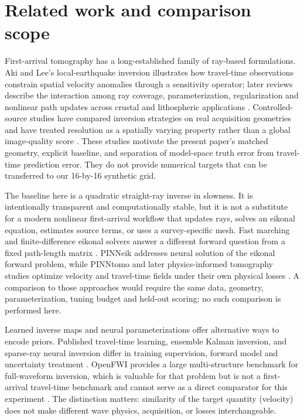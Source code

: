 \documentclass[11pt]{article}
\begin{document}
\section{Related work and comparison scope}\label{sec:related-work}
First-arrival tomography has a long-established family of ray-based formulations. Aki and Lee's local-earthquake inversion illustrates how travel-time observations constrain spatial velocity anomalies through a sensitivity operator; later reviews describe the interaction among ray coverage, parameterization, regularization and nonlinear path updates across crustal and lithospheric applications \cite{aki_lee_1976,rawlinson_sambridge_2003}. Controlled-source studies have compared inversion strategies on real acquisition geometries and have treated resolution as a spatially varying property rather than a global image-quality score \cite{zelt_barton_1998,zelt_resolution_1998}. These studies motivate the present paper's matched geometry, explicit baseline, and separation of model-space truth error from travel-time prediction error. They do not provide numerical targets that can be transferred to our 16-by-16 synthetic grid.

The baseline here is a quadratic straight-ray inverse in slowness. It is intentionally transparent and computationally stable, but it is not a substitute for a modern nonlinear first-arrival workflow that updates rays, solves an eikonal equation, estimates source terms, or uses a survey-specific mesh. Fast marching and finite-difference eikonal solvers answer a different forward question from a fixed path-length matrix \cite{vidale_1988,podvin_lecomte_1991}. PINNeik addresses neural solution of the eikonal forward problem, while PINNtomo and later physics-informed tomography studies optimize velocity and travel-time fields under their own physical losses \cite{pinneik_2021,waheed_2021,song_2025}. A comparison to those approaches would require the same data, geometry, parameterization, tuning budget and held-out scoring; no such comparison is performed here.

Learned inverse maps and neural parameterizations offer alternative ways to encode priors. Published travel-time learning, ensemble Kalman inversion, and sparse-ray neural inversion differ in training supervision, forward model and uncertainty treatment \cite{fan_ying_2023,eki_nn_2024,volcano_ann_2024}. OpenFWI provides a large multi-structure benchmark for full-waveform inversion, which is valuable for that problem but is not a first-arrival travel-time benchmark and cannot serve as a direct comparator for this experiment \cite{openfwi_2022}. The distinction matters: similarity of the target quantity (velocity) does not make different wave physics, acquisition, or losses interchangeable.
\end{document}
